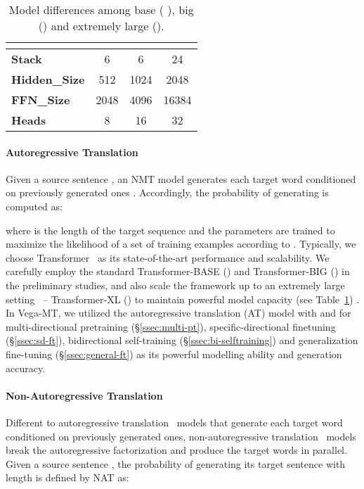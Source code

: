 \documentclass[11pt,a4paper]{article}
\newcommand{\zct}{\color{black}}
\begin{document}
\begin{table}[]
    \centering
    \begin{tabular}{lccc}
    \toprule
    \textbf{} & \bf  & \bf  & \bf   \\ \hline
    {\bf Stack}  &     6    & 6     & 24    \\
    {\bf Hidden\_Size}  &    512       & 1024  & 2048  \\
    {\bf FFN\_Size}  &     2048        & 4096  & 16384 \\
    {\bf Heads}  &    8    & 16    & 32    \\
    \bottomrule
    \end{tabular}
    \caption{\label{tab:models} Model differences among base (  ), big () and extremely large ().}
\end{table}

\paragraph{Autoregressive Translation}
Given a source sentence , an NMT model generates each target word  conditioned on previously generated ones . Accordingly, the probability of generating  is computed as:

where  is the length of the target sequence and the parameters  are trained to maximize the likelihood of a set of training examples according to . Typically, we choose Transformer~\cite{transformer} as its state-of-the-art performance and scalability. We carefully employ the standard Transformer-\textsc{BASE} () and Transformer-\textsc{BIG} () in the preliminary studies, and also scale the framework up to an extremely large setting~\cite{facebook2021} -- Transformer-\textsc{XL} () to maintain powerful model capacity {\zct (see Table~\ref{tab:models}) }.
In Vega-MT, we utilized {\zct the} autoregressive translation (AT) model with  and  for {multi-directional pretraining} (\S\ref{ssec:multi-pt}), {specific-directional finetuning} (\S\ref{ssec:sd-ft}), {bidirectional self-training} (\S\ref{ssec:bi-selftraining}) and {generalization fine-tuning} (\S\ref{ssec:general-ft}) as its powerful modelling ability and generation accuracy.

\paragraph{Non-Autoregressive Translation}
Different to autoregressive translation~\cite[AT]{rnnsearch,transformer} models that generate each target word conditioned on previously generated ones, non-autoregressive translation~\cite[NAT]{gu2018non} models break the autoregressive factorization and produce the target words in parallel.
Given a source sentence , the probability of generating its target sentence  with length  is defined by NAT as:
\end{document}
